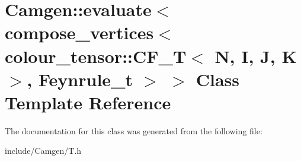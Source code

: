 \hypertarget{a00160}{\section{Camgen\-:\-:evaluate$<$ compose\-\_\-vertices$<$ colour\-\_\-tensor\-:\-:C\-F\-\_\-\-T$<$ N, I, J, K $>$, Feynrule\-\_\-t $>$ $>$ Class Template Reference}
\label{a00160}
}


The documentation for this class was generated from the following file\-:\begin{DoxyCompactItemize}
\item 
include/\-Camgen/T.\-h\end{DoxyCompactItemize}
